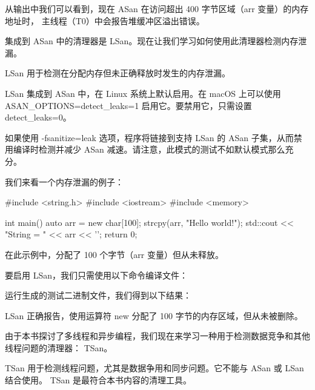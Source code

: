 从输出中我们可以看到，现在 ASan 在访问超出 400 字节区域（arr 变量）的内存地址时，
主线程（T0）中会报告堆缓冲区溢出错误。

集成到 ASan 中的清理器是 LSan。现在让我们学习如何使用此清理器检测内存泄漏。


LSan 用于检测在分配内存但未正确释放时发生的内存泄漏。

LSan 集成到 ASan 中，在 Linux 系统上默认启用。在 macOS 上可以使用 ASAN\_OPTIONS=detect\_leaks=1 启用它。要禁用它，只需设置 detect\_leaks=0。

如果使用 -fsanitize=leak 选项，程序将链接到支持 LSan 的 ASan 子集，从而禁用编译时检测并减少 ASan 减速。请注意，此模式的测试不如默认模式那么充分。

我们来看一个内存泄漏的例子：

\begin{cpp}
#include <string.h>
#include <iostream>
#include <memory>

int main() {
    auto arr = new char[100];
    strcpy(arr, "Hello world!");
    std::cout << "String = " << arr << '\n';
    return 0;
}
\end{cpp}

在此示例中，分配了 100 个字节（arr 变量）但从未释放。

要启用 LSan，我们只需使用以下命令编译文件：


运行生成的测试二进制文件，我们得到以下结果：


LSan 正确报告，使用运算符 new 分配了 100 字节的内存区域，但从未被删除。

由于本书探讨了多线程和异步编程，我们现在来学习一种用于检测数据竞争和其他线程问题的清理器： TSan。


TSan 用于检测线程问题，尤其是数据争用和同步问题。它不能与 ASan 或 LSan 结合使用。
TSan 是最符合本书内容的清理工具。

